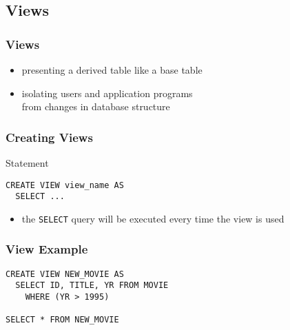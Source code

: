\documentclass[dvipsnames]{beamer}
\theoremstyle{plain}
\begin{document}
\subsection{Views}

\begin{frame}
  \frametitle{Views}

  \begin{itemize}
    \item presenting a derived table like a base table

    \pause
    \item isolating users and application programs\\
      from changes in database structure
  \end{itemize}
\end{frame}

\begin{frame}[fragile]
  \frametitle{Creating Views}

  \begin{block}{Statement}
    \begin{lstlisting}
CREATE VIEW view_name AS
  SELECT ...
    \end{lstlisting}
  \end{block}

  \begin{itemize}
    \item the \lstinline!SELECT! query will be executed every time the view is
      used
  \end{itemize}
\end{frame}

\begin{frame}[fragile]
  \frametitle{View Example}

  \begin{example}
    \begin{lstlisting}
CREATE VIEW NEW_MOVIE AS
  SELECT ID, TITLE, YR FROM MOVIE
    WHERE (YR > 1995)

SELECT * FROM NEW_MOVIE
    \end{lstlisting}
  \end{example}
\end{frame}
\end{document}
